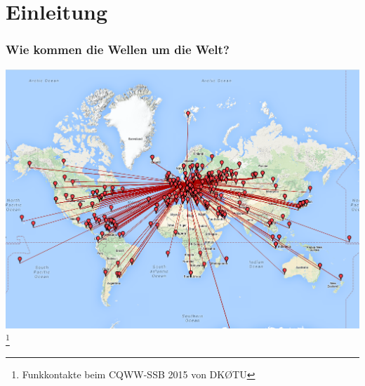 

\subtitle{Technik 09: \\
           Die Wellenausbreitung \\[2em]}
\date{Stand 02.12.2015}



\section*{Einleitung}

\begin{frame}
    \frametitle{Wie kommen die Wellen um die Welt?}
    \begin{center}
        \includegraphics[width=1\textwidth,height=.8\textheight,keepaspectratio]{e09/cqww-kontakte-2015.png}
        \footnote{\tiny Funkkontakte beim CQWW-SSB 2015 von DK\O TU}
    \end{center}
\end{frame}

